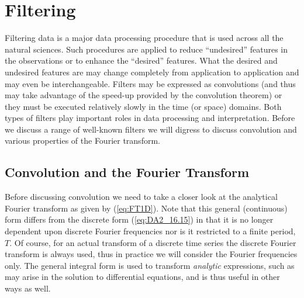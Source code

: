 

\section{Filtering}

Filtering data is a major data processing procedure that is used across all the natural sciences.  Such procedures are applied to
reduce ``undesired'' features in the observations or to enhance the ``desired'' features.  What the desired and
undesired features are may change completely from application to application and may even be interchangeable.
Filters may be expressed as convolutions (and thus may take advantage
of the speed-up provided by the convolution theorem) or they must be executed relatively slowly in the time (or space) domains.
Both types of filters play important roles in data processing and interpretation.  Before we discuss a range of well-known
filters we will digress to discuss convolution and various properties of the Fourier transform.

\subsection{Convolution and the Fourier Transform}

Before discussing convolution we need to take a closer look at the analytical
Fourier transform as given by (\ref{eq:FT1D}).
Note that this general (continuous) form differs from the discrete form (\ref{eq:DA2_16.15}) in that it is no
longer dependent upon discrete Fourier frequencies nor is it restricted to a finite period, $T$.
Of course, for an actual transform of a discrete time series the discrete Fourier transform is always
used, thus in practice we will consider the Fourier frequencies only. The general integral form is used to transform
\emph{analytic} expressions, such as may arise in the solution to differential equations, and is thus useful in other ways as well.


